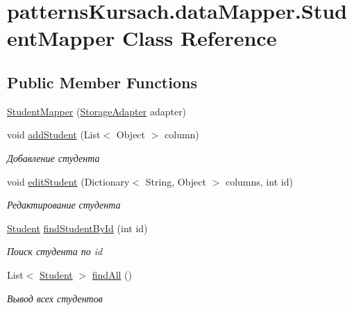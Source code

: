 \hypertarget{classpatterns_kursach_1_1data_mapper_1_1_student_mapper}{}\section{patterns\+Kursach.\+data\+Mapper.\+Student\+Mapper Class Reference}
\label{classpatterns_kursach_1_1data_mapper_1_1_student_mapper}
\subsection*{Public Member Functions}
\begin{DoxyCompactItemize}
\item 
\mbox{\hyperlink{classpatterns_kursach_1_1data_mapper_1_1_student_mapper_abe2ee2a1d99ec8a670b06e14bf485978}{Student\+Mapper}} (\mbox{\hyperlink{classpatterns_kursach_1_1_storage_adapter}{Storage\+Adapter}} adapter)
\item 
void \mbox{\hyperlink{classpatterns_kursach_1_1data_mapper_1_1_student_mapper_adc1a026a6c10fa11740bd6f9a39231b0}{add\+Student}} (List$<$ Object $>$ column)
\begin{DoxyCompactList}\small\item\em Добавление студента \end{DoxyCompactList}\item 
void \mbox{\hyperlink{classpatterns_kursach_1_1data_mapper_1_1_student_mapper_ab37f2fdaef6951f4fe350d79f1ae3149}{edit\+Student}} (Dictionary$<$ String, Object $>$ columns, int id)
\begin{DoxyCompactList}\small\item\em Редактирование студента \end{DoxyCompactList}\item 
\mbox{\hyperlink{classpatterns_kursach_1_1_student}{Student}} \mbox{\hyperlink{classpatterns_kursach_1_1data_mapper_1_1_student_mapper_a0cfc1d01eebb1fabbe72aeccec55ade6}{find\+Student\+By\+Id}} (int id)
\begin{DoxyCompactList}\small\item\em Поиск студента по id \end{DoxyCompactList}\item 
List$<$ \mbox{\hyperlink{classpatterns_kursach_1_1_student}{Student}} $>$ \mbox{\hyperlink{classpatterns_kursach_1_1data_mapper_1_1_student_mapper_a19faeafa6a8b94bdd7272d47b0f4168b}{find\+All}} ()
\begin{DoxyCompactList}\small\item\em Вывод всех студентов \end{DoxyCompactList}\item 

\end{DoxyCompactItemize}
